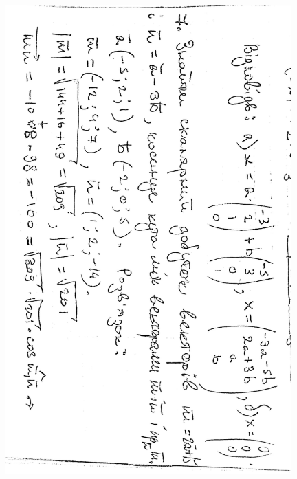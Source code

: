 \documentclass{article}
\begin{document}
\includegraphics[width=11cm,angle=90]{ons/10.jpg}\\
\end{document}
